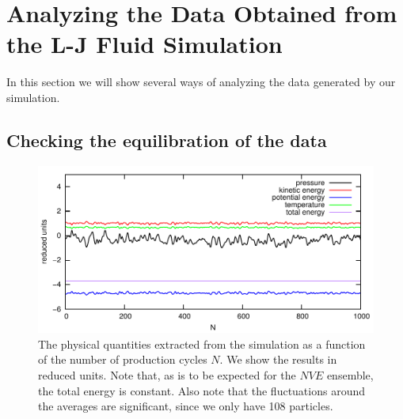 \documentclass[
paper=a4,                       %
fontsize=11pt,                  %
twoside,                        %
footsepline,                    %
headsepline,                    %
headinclude=false,              %
footinclude=false,              %
pagesize,                       %
]{scrartcl}
\newtheorem{task}{Task}
\begin{document}
\section{\label{sec:ana}Analyzing the Data Obtained from the \es{} L-J Fluid Simulation}

In this section we will show several ways of analyzing the data generated by our \es{} simulation. 

\subsection{Checking the equilibration of the data}

\begin{figure}[!ht]
\begin{center}
\includegraphics[width=\textwidth]{figures/energy}
\caption{\label{fig:energy} The physical quantities extracted from the simulation as a function of the number of production cycles $N$. We show the results in reduced units. Note that, as is to be expected for the $NVE$ ensemble, the total energy is constant. Also note that the fluctuations around the averages are significant, since we only have 108 particles.}
\end{center}
\end{figure}

\vspace{1cm}
\vspace{1cm}
\end{document}
